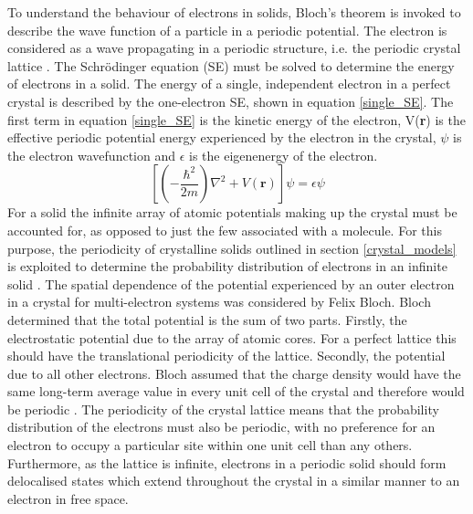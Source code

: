 \documentclass[11pt, twoside]{report}
\begin{document}
To understand the behaviour of electrons in solids, Bloch's theorem is invoked to describe the wave function of a particle in a periodic potential. The electron is considered as a wave propagating in a periodic structure, i.e. the periodic crystal lattice \cite{small_semiconductor1}. The Schr{\"o}dinger equation (SE) must be solved to determine the energy of electrons in a solid. 
The energy of a single, independent electron in a perfect crystal is described by the one-electron SE, shown in equation \ref{single_SE}. The first term in equation \ref{single_SE} is the kinetic energy of the electron, V(\textbf{r}) is the effective periodic potential energy experienced by the electron in the crystal, $\psi$ is the electron wavefunction and $\epsilon$ is the eigenenergy of the electron.
\begin{equation} \label{single_SE}
\left[ \left(-\frac{\hbar^2}{2m}\right)\nabla^2 + V(\mathbf{r})\right]\psi = \epsilon \psi 
\end{equation}
For a solid the infinite array of atomic potentials making up the crystal must be accounted for, as opposed to just the few associated with a molecule. For this purpose, the periodicity of crystalline solids outlined in section \ref{crystal_models} is exploited to determine the probability distribution of electrons in an infinite solid \cite{Nelson3}. 
The spatial dependence of the potential experienced by an outer electron in a crystal for multi-electron systems was considered by Felix Bloch. Bloch determined that the total potential is the sum of two parts. Firstly, the electrostatic potential due to the array of atomic cores. For a perfect lattice this should have the translational periodicity of the lattice. Secondly, the potential due to all other electrons. Bloch assumed that the charge density would have the same long-term average value in every unit cell of the crystal and therefore would be periodic \cite{fund_semi}.
The periodicity of the crystal lattice means that the probability distribution of the electrons must also be periodic, with no preference for an electron to occupy a particular site within one unit cell than any others. Furthermore, as the lattice is infinite, electrons in a periodic solid should form delocalised states which extend throughout the crystal in a similar manner to an electron in free space.

\end{document}
